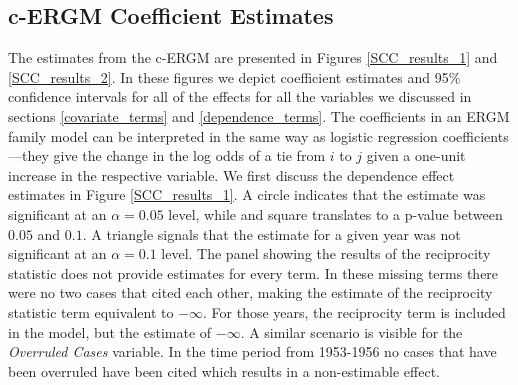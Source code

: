 \documentclass[headsepline=true, abstracton]{scrartcl}
\begin{document}
  
  
  
\subsection{c-ERGM Coefficient Estimates}
The estimates from the c-ERGM are presented in Figures \ref{SCC_results_1} and \ref{SCC_results_2}. In these figures we depict coefficient estimates and 95\% confidence intervals for all of the effects for all the variables we discussed in sections \ref{covariate_terms} and \ref{dependence_terms}. The coefficients in an ERGM family model can be interpreted in the same way as logistic regression coefficients---they give the change in the log odds of a tie from $i$ to $j$ given a one-unit increase in the respective variable. We first discuss the dependence effect estimates in Figure \ref{SCC_results_1}. A circle indicates that the estimate was significant at an $\alpha=0.05$ level, while and square translates to a p-value between $0.05$ and $0.1$. A triangle signals that the estimate for a given year was not significant at an $\alpha=0.1$ level. The panel showing the results of the reciprocity statistic does not provide estimates for every term. In these missing terms there were no two cases that cited each other, making the estimate of the reciprocity statistic term equivalent to $-\infty$. For those years, the reciprocity term is included in the model, but the estimate of $-\infty$. A similar scenario is visible for the \textit{Overruled Cases} variable. In the time period from 1953-1956 no cases that have been overruled have been cited which results in a non-estimable effect.
\end{document}
